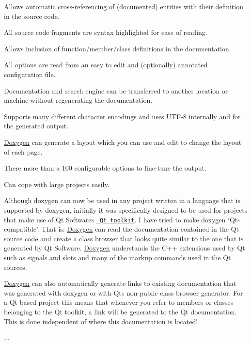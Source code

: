 \begin{DoxyItemize}
\item Allows automatic cross-\/referencing of (documented) entities with their definition in the source code. 
\item All source code fragments are syntax highlighted for ease of reading. 
\item Allows inclusion of function/member/class definitions in the documentation. 
\item All options are read from an easy to edit and (optionally) annotated configuration file. 
\item Documentation and search engine can be transferred to another location or machine without regenerating the documentation. 
\item Supports many different character encodings and uses U\+T\+F-\/8 internally and for the generated output. 
\item \mbox{\hyperlink{class_doxygen}{Doxygen}} can generate a layout which you can use and edit to change the layout of each page. 
\item There more than a 100 configurable options to fine-\/tune the output. 
\item Can cope with large projects easily. 
\end{DoxyItemize}

Although doxygen can now be used in any project written in a language that is supported by doxygen, initially it was specifically designed to be used for projects that make use of Qt Software\textquotesingle{}s \href{https://www.qt.io/developers/}{\texttt{ Qt toolkit}}. I have tried to make doxygen `Qt-\/compatible'. That is\+: \mbox{\hyperlink{class_doxygen}{Doxygen}} can read the documentation contained in the Qt source code and create a class browser that looks quite similar to the one that is generated by Qt Software. \mbox{\hyperlink{class_doxygen}{Doxygen}} understands the C++ extensions used by Qt such as signals and slots and many of the markup commands used in the Qt sources.

\mbox{\hyperlink{class_doxygen}{Doxygen}} can also automatically generate links to existing documentation that was generated with doxygen or with Qt\textquotesingle{}s non-\/public class browser generator. For a Qt based project this means that whenever you refer to members or classes belonging to the Qt toolkit, a link will be generated to the Qt documentation. This is done independent of where this documentation is located!



... 
